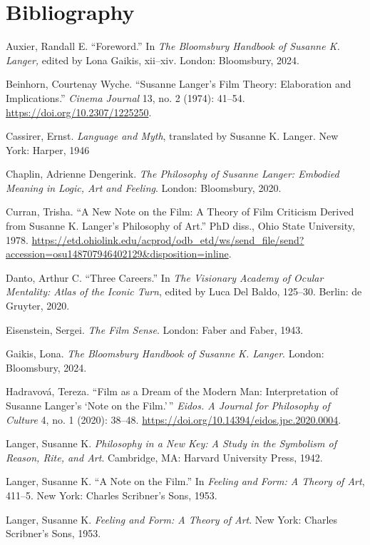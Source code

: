 \documentclass{tufte-handout}
\begin{document}
\newpage\section{Bibliography}\label{bibliography}

\begin{hangparas}{.25in}{1} 



Auxier, Randall E. ``Foreword.'' In \emph{The Bloomsbury Handbook of
Susanne K. Langer,} edited by Lona Gaikis, xii--xiv. London: Bloomsbury,
2024.

Beinhorn, Courtenay Wyche. ``Susanne Langer's Film Theory: Elaboration
and Implications.'' \emph{Cinema Journal} 13, no. 2 (1974): 41--54.
\url{https://doi.org/10.2307/1225250}.

Cassirer, Ernst. \emph{Language and Myth}, translated by Susanne K.
Langer. New York: Harper, 1946

Chaplin, Adrienne Dengerink. \emph{The Philosophy of Susanne Langer:
Embodied Meaning in Logic, Art and Feeling}. London: Bloomsbury, 2020.

Curran, Trisha. ``A New Note on the Film: A Theory of Film Criticism
Derived from Susanne K. Langer's Philosophy of Art.'' PhD diss., Ohio
State University, 1978.
\url{https://etd.ohiolink.edu/acprod/odb_etd/ws/send_file/send?accession=osu148707946402129\&disposition=inline}.

Danto, Arthur C. ``Three Careers.'' In \emph{The Visionary Academy of
Ocular Mentality: Atlas of the Iconic Turn}, edited by Luca Del Baldo,
125--30. Berlin: de Gruyter, 2020.

Eisenstein, Sergei. \emph{The Film Sense}. London: Faber and Faber,
1943.

Gaikis, Lona. \emph{The Bloomsbury Handbook of Susanne K. Langer}.
London: Bloomsbury, 2024.

Hadravová, Tereza. ``Film as a Dream of the Modern Man: Interpretation
of Susanne Langer's `Note on the Film.'\,'' \emph{Eidos. A Journal for
Philosophy of Culture} 4, no. 1 (2020): 38--48.
\url{https://doi.org/10.14394/eidos.jpc.2020.0004}.

Langer, Susanne K. \emph{Philosophy in a New Key: A Study in the
Symbolism of Reason, Rite, and Art}. Cambridge, MA: Harvard University
Press, 1942.

Langer, Susanne K. ``A Note on the Film.'' In \emph{Feeling and Form: A
Theory of Art}, 411--5. New York: Charles Scribner's Sons, 1953.

Langer, Susanne K. \emph{Feeling and Form: A Theory of Art}. New York:
Charles Scribner's Sons, 1953.


\end{hangparas}
\end{document}
